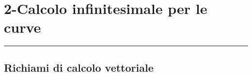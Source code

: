 \section*{2-Calcolo infinitesimale per le curve}
\rule{\textwidth}{2pt}
\subsection*{Richiami di calcolo vettoriale}

